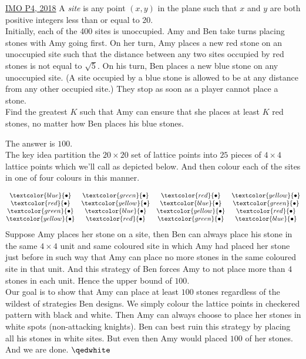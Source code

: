 	\begin{problem}{2}{\href{https://artofproblemsolving.com/community/c6h1671290p35965430}{IMO P4, 2018}}
		A \emph{site} is any point $(x, y)$ in the plane such that $x$ and $y$ are both positive integers less than or equal to 20.\\
	Initially, each of the 400 sites is unoccupied. Amy and Ben take turns placing stones with Amy going first. On her turn, Amy places a new red stone on an unoccupied site such that the distance between any two sites occupied by red stones is not equal to $\sqrt{5}$. On his turn, Ben places a new blue stone on any unoccupied site. (A site occupied by a blue stone is allowed to be at any distance from any other occupied site.) They stop as soon as a player cannot place a stone.\\
	Find the greatest $K$ such that Amy can ensure that she places at least $K$ red stones, no matter how Ben places his blue stones.
	\begin{solution} The answer is $100$.\\
	
		\noindent{} The key idea  partition the $20\times 20$ set of lattice points into $25$ pieces of $4\times 4$ lattice points which we'll call  as depicted below. And then colour each of the sites in one of four colours in this manner.

	$$\begin{matrix}
		\textcolor{blue}{\bullet} & \textcolor{green}{\bullet} & \textcolor{red}{\bullet} & \textcolor{yellow}{\bullet}\\
		\textcolor{red}{\bullet} & \textcolor{yellow}{\bullet} & \textcolor{blue}{\bullet} & \textcolor{green}{\bullet}\\
		\textcolor{green}{\bullet} & \textcolor{blue}{\bullet} & \textcolor{yellow}{\bullet} & \textcolor{red}{\bullet}\\
		\textcolor{yellow}{\bullet} & \textcolor{red}{\bullet} & \textcolor{green}{\bullet} & \textcolor{blue}{\bullet}
	\end{matrix}$$
	\indent Suppose Amy places her stone on a site, then Ben can always place his stone in the same $4\times 4$ unit and same coloured site in which Amy had placed her stone just before in such way that Amy can place no more stones in the same coloured site in that unit. And this strategy of Ben forces Amy to not place more than $4$ stones in each unit. Hence the upper bound of $100$.\\

		\noindent{} Our goal is to show that Amy can place at least $100$ stones regardless of the wildest of strategies Ben designs. We simply colour the lattice points in checkered pattern with black and white. Then Amy can always choose to place her stones in white spots (non-attacking knights). Ben can best ruin this strategy by placing all his stones in white sites. But even then Amy would placed $100$ of her stones.\\

	\noindent And we are done. $\qedwhite$

	\end{solution}
\end{problem}
